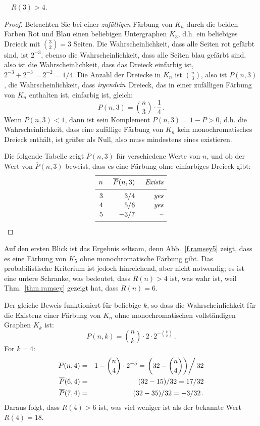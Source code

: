 \begin{theorem}[Erd\H{o}s]
$\quad R(3) > 4$.
\end{theorem}
\begin{proof}
Betrachten Sie bei einer \emph{zufälligen} Färbung von $K_n$ durch die beiden Farben Rot und Blau einen beliebigen Untergraphen $K_3$, d.h. ein beliebiges Dreieck mit $\binom{3}{2}=3$ Seiten. Die Wahrscheinlichkeit, dass alle Seiten rot gefärbt sind, ist $2^{-3}$, ebenso die Wahrscheinlichkeit, dass alle Seiten blau gefärbt sind, also ist die Wahrscheinlichkeit, dass das Dreieck einfarbig ist, $2^{-3}+2^{-3}=2^{-2}=1/4$. Die Anzahl der Dreiecke in $K_n$ ist $\binom{n}{3}$, also ist $P(n,3)$, die Wahrscheinlichkeit, dass $\emph{irgendein}$ Dreieck, das in einer zufälligen Färbung von $K_n$ enthalten ist, einfarbig ist, gleich:
\[
P(n,3)=\binom{n}{3}\cdot \frac{1}{4}\,.
\]
Wenn $P(n,3)<1$, dann ist sein Komplement $\overline{P}(n,3)=1-P>0$, d.h. die Wahrscheinlichkeit, dass eine zufällige Färbung von $K_n$ kein monochromatisches Dreieck enthält, ist größer als Null, also muss mindestens eines existieren.

Die folgende Tabelle zeigt $\overline{P}(n,3)$ für verschiedene Werte von $n$, und ob der Wert von $\overline{P}(n,3)$ beweist, dass es eine Färbung ohne einfarbiges Dreieck gibt:
\[
\renewcommand*{\arraystretch}{1.1}
\begin{array}{r@{\hspace{5mm}}r@{\hspace{5mm}}r}
\hline
\noalign{\smallskip}
n & \overline{P}(n,3) & \textit{Exists}\\
\noalign{\smallskip}\hline\noalign{\smallskip}
3 & 3/4 & \textit{yes} \\
4 & 5/6 & \textit{yes}\\
5 & -3/7 & \textrm{--}\\
\noalign{\smallskip}
 \hline
 \end{array}
\]
\end{proof}
Auf den ersten Blick ist das Ergebnis seltsam, denn Abb.~\ref{f.ramsey5} zeigt, dass es eine Färbung von $K_5$ ohne monochromatische Färbung gibt. Das probabilistische Kriterium ist jedoch hinreichend, aber nicht notwendig; es ist eine untere Schranke, was bedeutet, dass $R(n)>4$ ist, was wahr ist, weil Thm.~\ref{thm.ramsey} gezeigt hat, dass $R(n)=6$.

Der gleiche Beweis funktioniert für beliebige $k$, so dass die Wahrscheinlichkeit für die Existenz einer Färbung von $K_n$ ohne monochromatischen vollständigen Graphen $K_k$ ist:
\[
P(n,k)=\binom{n}{k}\cdot 2\cdot 2^{-\binom{k}{2}}\,.
\]
For $k=4$:
\begin{eqnarray*}
\overline{P}(n,4)&=&1-\binom{n}{4}\cdot 2^{-5}=\left.\left(32-\binom{n}{4}\right)\right/32\\
\overline{P}(6,4)&=&(32-15)/32=17/32\\
\overline{P}(7,4)&=&(32-35)/32=-3/32\,.
\end{eqnarray*}
Daraus folgt, dass $R(4)>6$ ist, was viel weniger ist als der bekannte Wert $R(4)=18$.

